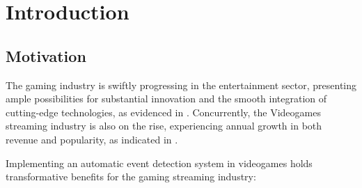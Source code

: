 
%

\chapter{Introduction}
\label{cha:introduction}


\epigraphfontsize{\small\itshape}
\setlength\epigraphwidth{12.5cm}
\setlength\epigraphrule{0pt}

\section{Motivation}
The gaming industry is swiftly progressing in the entertainment sector, presenting ample possibilities for substantial innovation and the smooth integration of cutting-edge technologies, as evidenced in \cite{VideogamesDataSurvey}. Concurrently, the Videogames streaming industry is also on the rise, experiencing annual growth in both revenue and popularity, as indicated in \cite{TwitchRevenue2023} \cite{TwitchAudience} \cite{COVID-19Pandemic_on_Live-Stream_Broadcasters_Twitch}.

Implementing an automatic event detection system in videogames holds transformative benefits for the gaming streaming industry:

